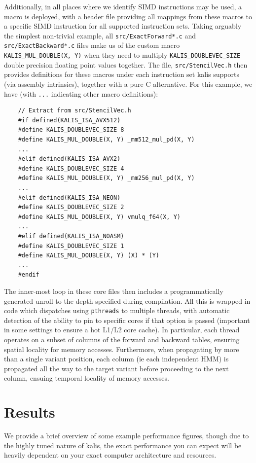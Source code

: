 \documentclass[pdflatex,referee,lineno,sn-nature]{sn-jnl}%
\let\proglang=\textsf
\newcommand{\pkg}[1]{{\fontseries{m}\fontseries{b}\selectfont #1}}
\begin{document}
Additionally, in all places where we identify SIMD instructions may be used, a macro is deployed, with a header file providing all mappings from these macros to a specific SIMD instruction for all supported instruction sets.
Taking arguably the simplest non-trivial example, all \texttt{src/ExactForward*.c} and \texttt{src/ExactBackward*.c} files make us of the custom macro \texttt{KALIS\_MUL\_DOUBLE(X,\ Y)} when they need to multiply \texttt{KALIS\_DOUBLEVEC\_SIZE} double precision floating point values together.
The file, \texttt{src/StencilVec.h} then provides definitions for these macros under each instruction set \pkg{kalis} supports (via assembly intrinsics), together with a pure \proglang{C} alternative.
For this example, we have (with \texttt{...} indicating other macro definitions):

\begin{verbatim}
	// Extract from src/StencilVec.h
	#if defined(KALIS_ISA_AVX512)
	#define KALIS_DOUBLEVEC_SIZE 8
	#define KALIS_MUL_DOUBLE(X, Y) _mm512_mul_pd(X, Y)
	...
	#elif defined(KALIS_ISA_AVX2)
	#define KALIS_DOUBLEVEC_SIZE 4
	#define KALIS_MUL_DOUBLE(X, Y) _mm256_mul_pd(X, Y)
	...
	#elif defined(KALIS_ISA_NEON)
	#define KALIS_DOUBLEVEC_SIZE 2
	#define KALIS_MUL_DOUBLE(X, Y) vmulq_f64(X, Y)
	...
	#elif defined(KALIS_ISA_NOASM)
	#define KALIS_DOUBLEVEC_SIZE 1
	#define KALIS_MUL_DOUBLE(X, Y) (X) * (Y)
	...
	#endif
\end{verbatim}

The inner-most loop in these core files then includes a programmatically generated unroll to the depth specified during compilation.
All this is wrapped in code which dispatches using \texttt{pthreads} to multiple threads, with automatic detection of the ability to pin to specific cores if that option is passed (important in some settings to ensure a hot L1/L2 core cache).
In particular, each thread operates on a subset of columns of the forward and backward tables, ensuring spatial locality for memory accesses.
Furthermore, when propagating by more than a single variant position, each column (ie each independent HMM) is propagated all the way to the target variant before proceeding to the next column, ensuing temporal locality of memory accesses.



\section*{Results}
\label{sec:perf}

We provide a brief overview of some example performance figures, though due to the highly tuned nature of \pkg{kalis}, the exact performance you can expect will be heavily dependent on your exact computer architecture and resources.
\end{document}
